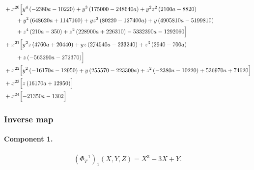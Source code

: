 \begin{align*}
&{}+x^{20}\Bigl[y^{4} \left(- 2380 a - 10220\right) + y^{3} \left(175000 - 248640 a\right) + y^{2} z^{2} \left(2100 a - 8820\right)\\
&\qquad + y^{2} \left(648620 a + 1147160\right) + y z^{2} \left(80220 - 127400 a\right) + y \left(4905810 a - 5199810\right)\\
&\qquad + z^{4} \left(210 a - 350\right) + z^{2} \left(228900 a + 226310\right) - 5332390 a - 1292060\Bigr]\\
&{}+x^{21}\Bigl[y^{2} z \left(4760 a + 20440\right) + y z \left(274540 a - 233240\right) + z^{3} \left(2940 - 700 a\right)\\
&\qquad + z \left(- 563290 a - 272370\right)\Bigr]\\
&{}+x^{22}\Bigl[y^{2} \left(- 16170 a - 12950\right) + y \left(255570 - 223300 a\right) + z^{2} \left(- 2380 a - 10220\right) + 536970 a + 74620\Bigr]\\
&{}+x^{23}\Bigl[z \left(16170 a + 12950\right)\Bigr]\\
&{}+x^{24}\Bigl[- 21350 a - 1302\Bigr]
\end{align*}
\endgroup

\subsubsection*{Inverse map}
\paragraph{Component 1.}
\begingroup
\allowdisplaybreaks[0]
\begin{gather*}
(\Phi_T^{-1})_1(X,Y,Z)=X^3-3X+Y.
\end{gather*}
\endgroup

